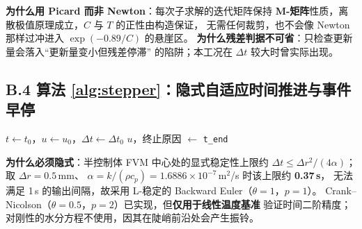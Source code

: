 \noindent\textbf{为什么用 Picard 而非 Newton}：每次子求解的迭代矩阵保持
\textbf{M-矩阵}性质，离散极值原理成立，$C$ 与 $T$ 的正性由构造保证，
无需任何裁剪，也不会像 Newton 那样过冲进入 $\exp(-0.89/C)$ 的悬崖区。
\textbf{为什么残差判据不可省}：只检查更新量会落入``更新量变小但残差停滞''
的陷阱；本工况在 $\Delta t$ 较大时曾实际出现。

\subsection*{B.4 算法 \ref{alg:stepper}：隐式自适应时间推进与事件早停}

\begin{algorithm}[H]
\caption{自适应时间推进（\texttt{time\_stepper.py}：\texttt{AdaptiveStepper.integrate}，第 107--287 行）}
\label{alg:stepper}
\BlankLine
$t \gets t_0$，$u \gets u_0$，$\Delta t \gets \Delta t_0$\;
\Return $u$，终止原因 $\gets$ \texttt{t\_end}\;
\end{algorithm}

\noindent\textbf{为什么必须隐式}：半控制体 FVM 中心处的显式稳定性上限约
$\Delta t\le\Delta r^2/(4\alpha)$；取 $\Delta r=0.5$\,mm、
$\alpha=k/(\rho c_p)=1.6886\times10^{-7}$\,m$^2$/s 时该上限约 \textbf{0.37\,s}，
无法满足 1\,s 的输出间隔，故采用 L-稳定的 Backward Euler（$\theta=1$，$p=1$）。
Crank--Nicolson（$\theta=0.5$，$p=2$）已实现，但\textbf{仅用于线性温度基准}
验证时间二阶精度；对刚性的水分方程不使用，因其在陡峭前沿处会产生振铃。

